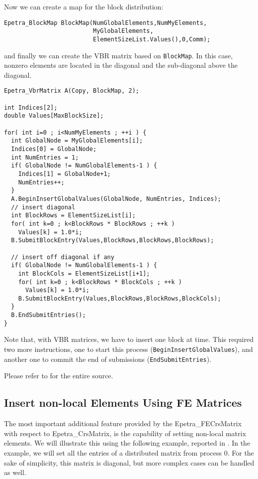 Now we can create a map for the block distribution:
\begin{verbatim}
Epetra_BlockMap BlockMap(NumGlobalElements,NumMyElements,
                         MyGlobalElements, 
                         ElementSizeList.Values(),0,Comm);
\end{verbatim}
and finally we can create the VBR matrix based on \verb!BlockMap!. In
this case, nonzero elements are located in the diagonal and the
sub-diagonal above the diagonal.
\begin{verbatim}
Epetra_VbrMatrix A(Copy, BlockMap, 2);

int Indices[2];
double Values[MaxBlockSize];

for( int i=0 ; i<NumMyElements ; ++i ) {
  int GlobalNode = MyGlobalElements[i];
  Indices[0] = GlobalNode;
  int NumEntries = 1;
  if( GlobalNode != NumGlobalElements-1 ) {
    Indices[1] = GlobalNode+1;
    NumEntries++;
  }
  A.BeginInsertGlobalValues(GlobalNode, NumEntries, Indices);
  // insert diagonal
  int BlockRows = ElementSizeList[i];
  for( int k=0 ; k<BlockRows * BlockRows ; ++k )
    Values[k] = 1.0*i;
  B.SubmitBlockEntry(Values,BlockRows,BlockRows,BlockRows);

  // insert off diagonal if any
  if( GlobalNode != NumGlobalElements-1 ) {
    int BlockCols = ElementSizeList[i+1];
    for( int k=0 ; k<BlockRows * BlockCols ; ++k )
      Values[k] = 1.0*i;
    B.SubmitBlockEntry(Values,BlockRows,BlockRows,BlockCols);
  }
  B.EndSubmitEntries();
}
\end{verbatim}
Note that, with VBR matrices, we have to insert one block at time.  This
required two more instructions, one to start this process
(\verb!BeginInsertGlobalValues!), and another one to commit the end of
submissions (\verb!EndSubmitEntries!).
 
\smallskip

Please refer to  for the entire source.



\subsection{Insert non-local Elements Using FE Matrices}
\label{sec:fematrix}

The most important additional feature provided by the
Epetra\_FECrsMatrix with respect to Epetra\_CrsMatrix, is the capability
of setting non-local matrix elements. We will illustrate this using the
following example, reported in . In the example,
we will set all the entries of a distributed matrix from process 0. For
the sake of simplicity, this matrix is diagonal, but more complex cases
can be handled as well.

